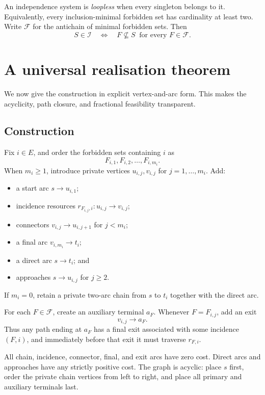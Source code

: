\documentclass[11pt]{article}
\theoremstyle{definition}
\newcommand{\calI}{\mathcal{I}}
\newcommand{\calF}{\mathcal{F}}
\begin{document}
An independence system is \emph{loopless} when every singleton belongs to it. Equivalently, every inclusion-minimal forbidden set has cardinality at least two. Write \(\calF\) for the antichain of minimal forbidden sets. Then
\[
S\in\calI
\quad\Longleftrightarrow\quad
F\nsubseteq S\ \text{ for every }F\in\calF.
\]

\section{A universal realisation theorem}\label{sec:universal}

We now give the construction in explicit vertex-and-arc form. This makes the acyclicity, path closure, and fractional feasibility transparent.

\subsection{Construction}

Fix \(i\in E\), and order the forbidden sets containing \(i\) as
\[
F_{i,1},F_{i,2},\ldots,F_{i,m_i}.
\]
When \(m_i\ge1\), introduce private vertices \(u_{i,j},v_{i,j}\) for \(j=1,\ldots,m_i\). Add:
\begin{itemize}
\item a start arc \(s\to u_{i,1}\);
\item incidence resources \(r_{F_{i,j},i}:u_{i,j}\to v_{i,j}\);
\item connectors \(v_{i,j}\to u_{i,j+1}\) for \(j<m_i\);
\item a final arc \(v_{i,m_i}\to t_i\);
\item a direct arc \(s\to t_i\); and
\item approaches \(s\to u_{i,j}\) for \(j\ge2\).
\end{itemize}
If \(m_i=0\), retain a private two-arc chain from \(s\) to \(t_i\) together with the direct arc.

For each \(F\in\calF\), create an auxiliary terminal \(a_F\). Whenever \(F=F_{i,j}\), add an exit
\[
v_{i,j}\to a_F.
\]
Thus any path ending at \(a_F\) has a final exit associated with some incidence \((F,i)\), and immediately before that exit it must traverse \(r_{F,i}\).

All chain, incidence, connector, final, and exit arcs have zero cost. Direct arcs and approaches have any strictly positive cost. The graph is acyclic: place \(s\) first, order the private chain vertices from left to right, and place all primary and auxiliary terminals last.
\end{document}
